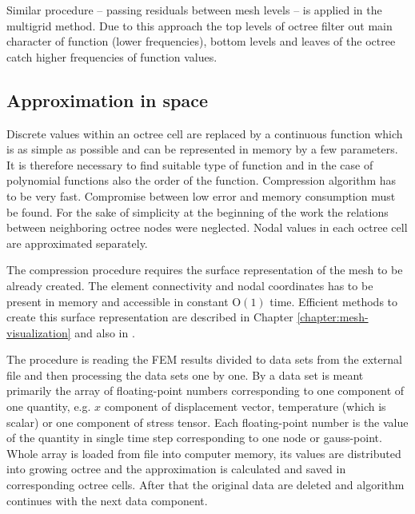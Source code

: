 Similar procedure -- passing residuals between mesh levels -- is applied in the multigrid method. Due to this approach the top levels of octree filter out main character of function (lower frequencies), bottom levels and leaves of the octree catch higher frequencies of function values.


\subsection{Approximation in space}
\label{sec:approximation-in-space}

Discrete values within an octree cell are replaced by a continuous function which is as simple as possible and can be represented in memory by a few parameters. It is therefore necessary to find suitable type of function and in the case of polynomial functions also the order of the function. Compression algorithm has to be very fast. Compromise between low error and memory consumption must be found. For the sake of simplicity at the beginning of the work the relations between neighboring octree nodes were neglected. Nodal values in each octree cell are approximated separately.

The compression procedure requires the surface representation of the mesh to be already created. The element connectivity and nodal coordinates has to be present in memory and accessible in constant $\mathrm{O}(1)$ time. Efficient methods to create this surface representation are described in Chapter \ref{chapter:mesh-visualization} and also in \cite{Benes2015}.

The procedure is reading the FEM results divided to data sets from the external file and then processing the data sets one by one. By a data set is meant primarily the array of floating-point numbers corresponding to one component of one quantity, e.g. $x$ component of displacement vector, temperature (which is scalar) or one component of stress tensor. Each floating-point number is the value of the quantity in single time step corresponding to one node or gauss-point. Whole array is loaded from file into computer memory, its values are distributed into growing octree and the approximation is calculated and saved in corresponding octree cells. After that the original data are deleted and algorithm continues with the next data component.

